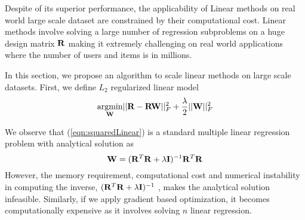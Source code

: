 

Despite of its superior performance, the applicability of Linear methods on real world large scale dataset are constrained by their computational cost. Linear methods involve solving  a large number of regression subproblems on a huge design matrix $\mathbf{R}$ making it extremely challenging on real world applications where the number of users and items is in millions.

In this section, we propose an algorithm to scale linear methods on large scale datasets. First, we define $L_2$ regularized linear model 
\begin{equation}
\label{eqn:squaredLinear}
\underset{\mathbf{W}}{\mathrm{argmin}}|| \mathbf{R} - \mathbf{R} \mathbf{W} ||_F^2 + \frac{\lambda}{2} || \mathbf{W} ||_F^2 
\end{equation}

We observe that (\ref{eqn:squaredLinear}) is a  standard multiple linear regression problem with analytical solution as
\begin{equation}
\mathbf{W} = (\mathbf{R}^T \mathbf{R} + \lambda \mathbf{I})^{-1} \mathbf{R}^T \mathbf{R}
\end{equation}
However, the  memory requirement, computational cost and  numerical instability in computing the inverse, $(\mathbf{R}^T \mathbf{R} + \lambda \mathbf{I})^{-1}$ , makes the analytical solution infeasible. Similarly, if we apply gradient based optimization, it becomes computationally expensive as it involves solving $n$ linear regression. 

